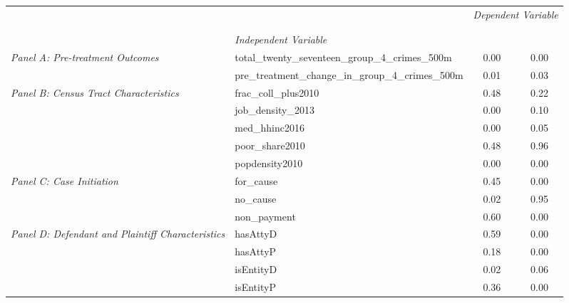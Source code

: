 \begin{tabular}{llcc}
\toprule
 &  & \multicolumn{2}{c}{\textit{Dependent Variable}} \\
\cline{3-4}
\\
 &  &  &  \\
 & \emph{Independent Variable} &  &  \\
\midrule
\multirow[c]{2}{3cm}{\textit{Panel A: Pre-treatment Outcomes}} & total_twenty_seventeen_group_4_crimes_500m & 0.00 & 0.00 \\
 & pre_treatment_change_in_group_4_crimes_500m & 0.01 & 0.03 \\
\cline{1-4}
\multirow[c]{5}{3cm}{\textit{Panel B: Census Tract Characteristics}} & frac_coll_plus2010 & 0.48 & 0.22 \\
 & job_density_2013 & 0.00 & 0.10 \\
 & med_hhinc2016 & 0.00 & 0.05 \\
 & poor_share2010 & 0.48 & 0.96 \\
 & popdensity2010 & 0.00 & 0.00 \\
\cline{1-4}
\multirow[c]{3}{3cm}{\textit{Panel C: Case Initiation}} & for_cause & 0.45 & 0.00 \\
 & no_cause & 0.02 & 0.95 \\
 & non_payment & 0.60 & 0.00 \\
\cline{1-4}
\multirow[c]{4}{3cm}{\textit{Panel D: Defendant and Plaintiff Characteristics}} & hasAttyD & 0.59 & 0.00 \\
 & hasAttyP & 0.18 & 0.00 \\
 & isEntityD & 0.02 & 0.06 \\
 & isEntityP & 0.36 & 0.00 \\
\cline{1-4}
\bottomrule
\end{tabular}
